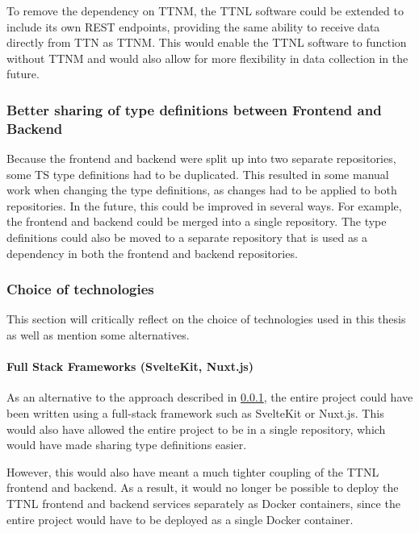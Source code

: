 To remove the dependency on \ac{TTNM}, the \ac{TTNL} software could be extended to include its own \ac{REST} endpoints, providing the same ability to receive data directly from \ac{TTN} as \ac{TTNM}.
This would enable the \ac{TTNL} software to function without \ac{TTNM} and would also allow for more flexibility in data collection in the future.

\subsubsection{Better sharing of type definitions between Frontend and Backend}\label{subsubsec:outlook-sharing-type-definitions}

Because the frontend and backend were split up into two separate repositories, some \ac{TS} type definitions had to be duplicated.
This resulted in some manual work when changing the type definitions, as changes had to be applied to both repositories.
In the future, this could be improved in several ways.
For example, the frontend and backend could be merged into a single repository.
The type definitions could also be moved to a separate repository that is used as a dependency in both the frontend and backend repositories.

\subsubsection{Choice of technologies}

This section will critically reflect on the choice of technologies used in this thesis as well as mention some alternatives.

\paragraph{Full Stack Frameworks (SvelteKit, Nuxt.js)}

As an alternative to the approach described in \cref{subsubsec:outlook-sharing-type-definitions}, the entire project could have been written using a full-stack framework such as SvelteKit or Nuxt.js.
This would also have allowed the entire project to be in a single repository, which would have made sharing type definitions easier.

However, this would also have meant a much tighter coupling of the \ac{TTNL} frontend and backend.
As a result, it would no longer be possible to deploy the \ac{TTNL} frontend and backend services separately as Docker containers, since the entire project would have to be deployed as a single Docker container.

